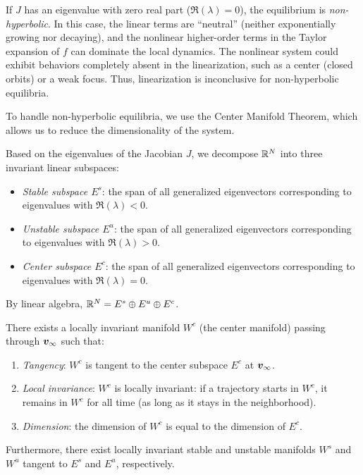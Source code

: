 \begin{remark}
If $J$ has an eigenvalue with zero real part ($\Re(\lambda) = 0$), the equilibrium is \textit{non-hyperbolic}. In this case, the linear terms are ``neutral'' (neither exponentially growing nor decaying), and the nonlinear higher-order terms in the Taylor expansion of $f$ can dominate the local dynamics. The nonlinear system could exhibit behaviors completely absent in the linearization, such as a center (closed orbits) or a weak focus. Thus, linearization is inconclusive for non-hyperbolic equilibria.
\end{remark}

To handle non-hyperbolic equilibria, we use the Center Manifold Theorem, which allows us to reduce the dimensionality of the system.

\begin{definition}
Based on the eigenvalues of the Jacobian $J$, we decompose $\mathbb{R}^N$ into three invariant linear subspaces:
\begin{itemize}
\item \textit{Stable subspace $E^s$}: the span of all generalized eigenvectors corresponding to eigenvalues with $\Re(\lambda) < 0$.
\item \textit{Unstable subspace $E^u$}: the span of all generalized eigenvectors corresponding to eigenvalues with $\Re(\lambda) > 0$.
\item \textit{Center subspace $E^c$}: the span of all generalized eigenvectors corresponding to eigenvalues with $\Re(\lambda) = 0$.
\end{itemize}
By linear algebra, $\mathbb{R}^N = E^s \oplus E^u \oplus E^c$.
\end{definition}

\begin{theorem}
There exists a locally invariant manifold $W^c$ (the center manifold) passing through $\bm{v}_\infty$ such that:
\begin{enumerate}
\item \textit{Tangency}: $W^c$ is tangent to the center subspace $E^c$ at $\bm{v}_\infty$.
\item \textit{Local invariance}: $W^c$ is locally invariant: if a trajectory starts in $W^c$, it remains in $W^c$ for all time (as long as it stays in the neighborhood).
\item \textit{Dimension}: the dimension of $W^c$ is equal to the dimension of $E^c$.
\end{enumerate}
Furthermore, there exist locally invariant stable and unstable manifolds $W^s$ and $W^u$ tangent to $E^s$ and $E^u$, respectively.
\end{theorem}

